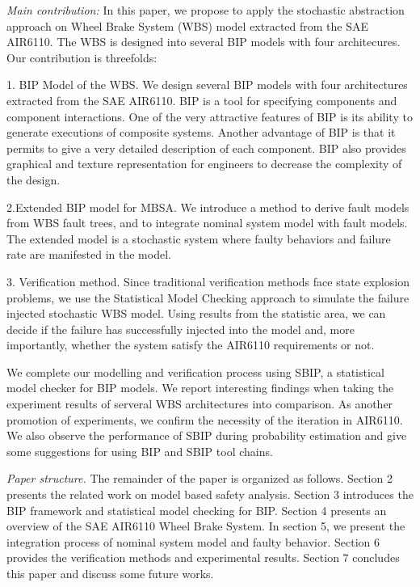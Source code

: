 \emph{Main contribution:} 
In this paper, we propose to apply the stochastic abstraction approach on Wheel Brake System (WBS) model extracted from the SAE AIR6110. The WBS is designed into several BIP models with four architecures. Our contribution is threefolds:

1. BIP Model of the WBS. We design several BIP models with four architectures extracted from the SAE AIR6110. BIP is a tool for specifying components and component interactions. One of the very attractive features of BIP is its ability to generate executions of composite systems. Another advantage of BIP is that it permits to give a very detailed description of each component. BIP also provides graphical and texture representation for engineers to decrease the complexity of the design.

2.Extended BIP model for MBSA. We introduce a method to derive fault models from WBS fault trees, and to integrate nominal system model with fault models. The extended model is a stochastic system where faulty behaviors and failure rate are manifested in the model.
 
3. Verification method. Since traditional verification methods face state explosion problems, we use the Statistical Model Checking\cite{vmcai04}\cite{cav04}\cite{cmu04} approach to simulate the failure injected stochastic WBS model. Using results from the statistic area, we can decide if the failure has successfully injected into the model and, more importantly, whether the system satisfy the AIR6110 requirements or not.

We complete our modelling and verification process using SBIP\cite{sbip18}, a statistical model checker for BIP models.
We report interesting findings when taking the experiment results of serveral WBS architectures into comparison. As another promotion of experiments, we confirm the necessity of the iteration in AIR6110. We also observe the performance of SBIP during probability estimation and give some suggestions for using BIP and SBIP tool chains.

\emph{Paper structure.}
The remainder of the paper is organized as follows. 
Section 2 presents the related work on model based safety analysis.
Section 3 introduces the BIP framework and statistical model checking for BIP\@.
Section 4 presents an overview of the SAE AIR6110 Wheel Brake System.
In section 5, we present the integration process of nominal system model and faulty behavior.
Section 6 provides the verification methods and experimental results.
Section 7 concludes this paper and discuss some future works.
